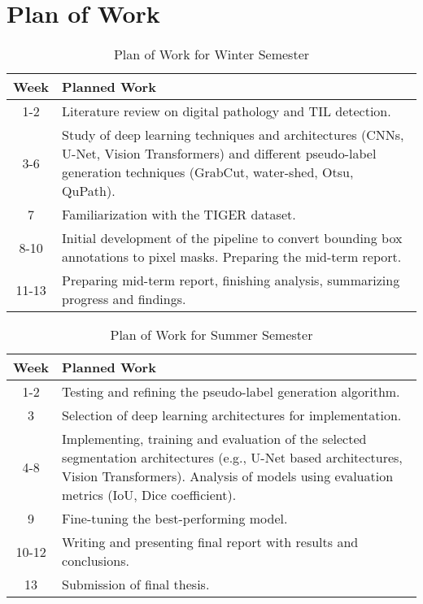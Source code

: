 \setcounter{figure}{0}
\setcounter{listing}{0}

\chapter{Plan of Work \label{cha:chapter1} }

\begin{table}[h!]
\centering
\begin{tabular}{|c|p{12.5cm}|}
\hline
\textbf{Week} & \textbf{Planned Work} \\ 
\hline
\hline
1-2 & Literature review on digital pathology and TIL detection. \\ 
\hline
3-6 & Study of deep learning techniques and architectures (CNNs, U-Net, Vision Transformers) and different pseudo-label generation techniques (GrabCut, water-shed, Otsu, QuPath). \\
\hline
7 & Familiarization with the TIGER dataset. \\
\hline
8-10 & Initial development of the pipeline to convert bounding box annotations to pixel masks. Preparing the mid-term report. \\ 
\hline
11-13 & Preparing mid-term report, finishing analysis, summarizing progress and findings. \\ 
\hline
\end{tabular}
\caption{Plan of Work for Winter Semester}
\label{tab:winter_plan}
\end{table}

\begin{table}[h!]
\centering
\begin{tabular}{|c|p{12.5cm}|}
\hline
\textbf{Week} & \textbf{Planned Work} \\ 
\hline
\hline
1-2 & Testing and refining the pseudo-label generation algorithm. \\
\hline
3 & Selection of deep learning architectures for implementation. \\ 
\hline
4-8 & Implementing, training and evaluation of the selected segmentation architectures (e.g., U-Net based architectures, Vision Transformers). Analysis of models using evaluation metrics (IoU, Dice coefficient). \\ 
\hline
9 & Fine-tuning the best-performing model. \\ 
\hline
10-12 & Writing and presenting final report with results and conclusions. \\ 
\hline
13 & Submission of final thesis. \\ 
\hline
\end{tabular}
\caption{Plan of Work for Summer Semester}
\label{tab:summer_plan}
\end{table}
